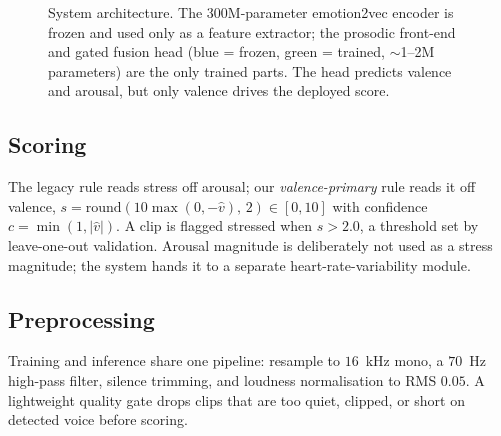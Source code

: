 \documentclass[conference]{IEEEtran}
\begin{document}
\begin{figure}[t]
\centering
{}
\caption{System architecture. The 300M-parameter emotion2vec encoder is frozen and
used only as a feature extractor; the prosodic front-end and gated fusion head
(blue = frozen, green = trained, $\sim$1--2M parameters) are the only trained
parts. The head predicts valence and arousal, but only valence drives the deployed
score.}
\label{fig:arch}
\end{figure}

\subsection{Scoring}
The legacy rule reads stress off arousal; our \emph{valence-primary} rule reads it
off valence, $s = \mathrm{round}(10\max(0,-\hat{v}),\,2)\in[0,10]$ with confidence
$c = \min(1,|\hat{v}|)$. A clip is flagged stressed when $s > 2.0$, a threshold set
by leave-one-out validation. Arousal magnitude is deliberately not used as a stress
magnitude; the system hands it to a separate heart-rate-variability module.

\subsection{Preprocessing}
Training and inference share one pipeline: resample to $16$~kHz mono, a $70$~Hz
high-pass filter, silence trimming, and loudness normalisation to RMS $0.05$. A
lightweight quality gate drops clips that are too quiet, clipped, or short on
detected voice before scoring.
\end{document}
